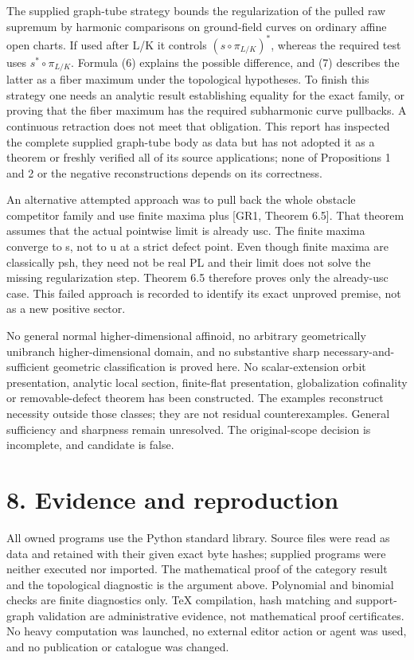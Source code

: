 \documentclass[11pt,a4paper]{article}
\begin{document}
The supplied graph-tube strategy bounds the regularization of the pulled raw supremum by harmonic comparisons on ground-field curves on ordinary affine open charts. If used after L/K it controls \((s\circ\pi_{L/K})^*\), whereas the required test uses \(s^*\circ\pi_{L/K}\). Formula (6) explains the possible difference, and (7) describes the latter as a fiber maximum under the topological hypotheses. To finish this strategy one needs an analytic result establishing equality for the exact family, or proving that the fiber maximum has the required subharmonic curve pullbacks. A continuous retraction does not meet that obligation. This report has inspected the complete supplied graph-tube body as data but has not adopted it as a theorem or freshly verified all of its source applications; none of Propositions 1 and 2 or the negative reconstructions depends on its correctness.

An alternative attempted approach was to pull back the whole obstacle competitor family and use finite maxima plus [GR1, Theorem 6.5]. That theorem assumes that the actual pointwise limit is already usc. The finite maxima converge to s, not to u at a strict defect point. Even though finite maxima are classically psh, they need not be real PL and their limit does not solve the missing regularization step. Theorem 6.5 therefore proves only the already-usc case. This failed approach is recorded to identify its exact unproved premise, not as a new positive sector.

No general normal higher-dimensional affinoid, no arbitrary geometrically unibranch higher-dimensional domain, and no substantive sharp necessary-and-sufficient geometric classification is proved here. No scalar-extension orbit presentation, analytic local section, finite-flat presentation, globalization cofinality or removable-defect theorem has been constructed. The examples reconstruct necessity outside those classes; they are not residual counterexamples. General sufficiency and sharpness remain unresolved. The original-scope decision is incomplete, and candidate is false.

\section*{8. Evidence and reproduction}

All owned programs use the Python standard library. Source files were read as data and retained with their given exact byte hashes; supplied programs were neither executed nor imported. The mathematical proof of the category result and the topological diagnostic is the argument above. Polynomial and binomial checks are finite diagnostics only. TeX compilation, hash matching and support-graph validation are administrative evidence, not mathematical proof certificates. No heavy computation was launched, no external editor action or agent was used, and no publication or catalogue was changed.
\end{document}
